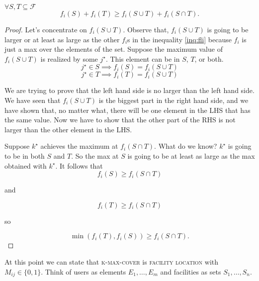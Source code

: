 \begin{claim}
 $\forall S, T \subseteq \mathcal{F}$
\begin{equation}\label{inq:fli}
f_i(S) + f_i(T) \geq f_i(S \cup T) + f_i(S \cap T).
\end{equation}	
\end{claim}
\begin{proof}
	Let's concentrate on $f_i(S \cup T)$. Observe that, $f_i(S \cup T)$ is going to be larger or at least as large as the other $f_i$s in the inequality \ref{inq:fli}  because $f_i$ is just a max over the elements of the set. Suppose the maximum value of $f_i(S \cup T)$ is realized by some $j^\star$. This element can be in $S$, $T$, or both.
	\begin{equation}
	j^\star\in S \implies f_i(S) = f_i(S \cup T)
	\end{equation}
\begin{equation}j^\star\in T \implies f_i(T) = f_i(S \cup T)\end{equation}

We are trying to prove that the left hand side is no larger than the left hand side. We have seen that $f_i(S \cup T)$ is the biggest part in the right hand side, and we have shown that, no matter what, there will be one element in the LHS that has the same value. Now we have to show that the other part of the RHS is not larger than the other element in the LHS.

Suppose $k^\star$ achieves the maximum at $f_i(S \cap T)$. What do we know? $k^\star$ is going to be in both $S$ and $T$. So the max at $S$ is going to be at least as large as the max obtained with $k^\star$. It follows that
\begin{equation}
 f_i(S) \geq f_i(S \cap T)
\end{equation}

and

\begin{equation}
f_i(T) \geq f_i(S \cap T)
\end{equation}

so

\begin{equation}
\min(f_i(T), f_i(S)) \geq f_i(S \cap T).
\end{equation}
\end{proof}

At this point we can state that \textsc{k-max-cover} is \textsc{facility location} with $M_{ij} \in \{0, 1\}$. Think of users as elements $E_1,\ldots, E_m$ and facilities as sets $S_1,\ldots, S_n$.

